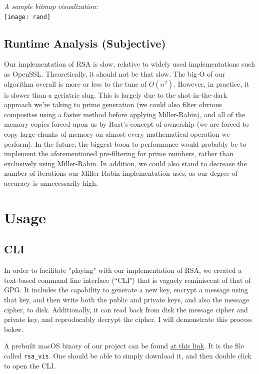 \documentclass{article}
\newcommand{\code}[1]{\colorbox{light-gray}{\texttt{#1}}}
\begin{document}
\begin{center}\textit{A sample bitmap visualization:} \\ \texttt{[image: rand]}\end{center}

\subsection{Runtime Analysis (Subjective)}
Our implementation of RSA is slow, relative to widely used implementations such as OpenSSL. Theoretically, it should not be that slow. The big-O of our algorithm overall is more or less to the tune of $O(n^2)$. However, in practice, it is slower than a geriatric slug. This is largely due to the shot-in-the-dark approach we're taking to prime generation (we could also filter obvious composites using a faster method before applying Miller-Rabin), and all of the memory copies forced upon us by Rust's concept of ownership (we are forced to copy large chunks of memory on almost every mathematical operation we perform). In the future, the biggest boon to performance would probably be to implement the aforementioned pre-filtering for prime numbers, rather than exclusively using Miller-Rabin. In addition, we could also stand to decrease the number of iterations our Miller-Rabin implementation uses, as our degree of accuracy is unnecessarily high.


\section{Usage}
\subsection{CLI}
In order to facilitate "playing" with our implementation of RSA, we created a text-based command line interface (``CLI") that is vaguely reminiscent of that of GPG. It includes the capability to generate a new key, encrypt a message using that key, and then write both the public and private keys, and also the message cipher, to disk. Additionally, it can read back from disk the message cipher and private key, and reproducably decrypt the cipher. I will demonstrate this process below.

A prebuilt macOS binary of our project can be found \href{https://github.com/DarthGeek01/rust-rsa-vis/releases/tag/v0.0}{at this link}. It is the file called \code{rsa\_vis}. One should be able to simply download it, and then double click to open the CLI. \\
\end{document}
